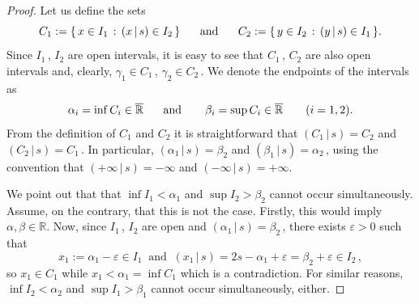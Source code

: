 \documentclass[12pt]{amsart}
\theoremstyle{remark}
\theoremstyle{definition}
\newcommand{\RR}{\mathbb{R}}
\newcommand{\RRx}{\overline{\mathbb{R}}}
\newcommand{\rfl}[2]{\left( #1 \, \vert \, #2 \right)}
\begin{document}
\begin{proof}
Let us define the sets 
\[
C_1 := \lbrace \, 
x \in I_1 \, : \, \rfl{x}{s} \in I_2 
\, \rbrace 
\hspace{5mm} \mbox{ and } \hspace{5mm} 
C_2 := \lbrace \, 
y \in I_2 \, : \, \rfl{y}{s} \in I_1 
\, \rbrace. 
\]
Since $ I_1 \,$, $ I_2 $ are open intervals, 
it is easy to see that 
$ C_1 \,$, $ C_2 $ are also open intervals and, 
clearly, 
$ \gamma_1 \in C_1 \,$, $ \gamma_2 \in C_2 \,$. 
We denote the endpoints of the intervals as 
\[
\alpha_i = \inf C_i \in \RRx 
\hspace{5mm} \mbox{ and } \hspace{5mm} \ 
\beta_i = \sup C_i \in \RRx 
\qquad (i=1,2). 
\]
From the definition of $ C_1 $ and $ C_2 $ it is 
straightforward that $ \rfl{C_1}{s} = C_2 $ and 
$ \rfl{C_2}{s} = C_1 \,$. 
In particular, 
$ \rfl{\alpha_1}{s} = \beta_2 $ and 
$ \rfl{\beta_1}{s} = \alpha_2 \,$, using the 
convention that 
$ \rfl{+ \infty}{s} = - \infty $ and 
$ \rfl{- \infty}{s} = + \infty $. 
 
We point out that that 
$ \inf I_1 < \alpha_1 $ and $ \sup I_2 > \beta_2 $ 
cannot occur simultaneously. 
Assume, on the contrary, that this is not the case. 
Firstly, this would imply 
$ \alpha , \beta \in \RR $. 
Now, since $ I_1 \,$, $ I_2 $ are open and 
$ \rfl{\alpha_1}{s} = \beta_2 \,$, 
there exists $ \varepsilon > 0 $ such that 
\[
x_1 := \alpha_1 - \varepsilon \in I_1 
\ \mbox{ and } \ 
\rfl{x_1}{s} = 2s - \alpha_1 + \varepsilon = 
\beta_2 + \varepsilon \in I_2 \,, 
\]
so 
$ x_1 \in C_1 $ while 
$ x_1 < \alpha_1 = \inf C_1 $ 
which is a contradiction. 
For similar reasons, 
$ \inf I_2 < \alpha_2 $ and $ \sup I_1 > \beta_1 $ 
cannot occur simultaneously, either. 


\end{proof}
\end{document}
